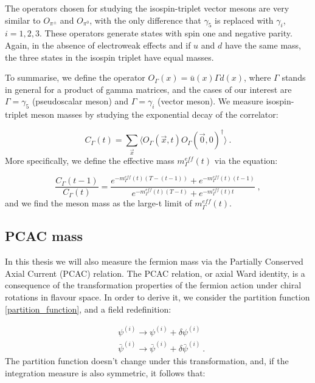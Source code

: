 The operators chosen for studying the isospin-triplet vector mesons are very similar to $O_{\pi^{\pm}}$ and $O_{\pi^0}$, with the only difference that $\gamma_5$ is replaced with $\gamma_i$, $i = 1, 2, 3$. These operators generate states with spin one and negative parity. Again, in the absence of electroweak effects and if $u$ and $d$ have the same mass, the three states in the isospin triplet have equal masses.

To summarise, we define the operator $O_{\Gamma}(x) = \bar u(x) \Gamma d(x) $, where $\Gamma$ stands in general for a product of gamma matrices, and the cases of our interest are $\Gamma =\gamma_5$ (pseudoscalar meson) and $\Gamma = \gamma_i$ (vector meson). We measure isospin-triplet meson masses by studying the exponential decay of the correlator:

\begin{equation}
C_{\Gamma}(t) = \sum_{\vec x} \langle O_{\Gamma}(\vec x,t) O_{\Gamma} (\vec 0, 0)^{\dagger} \rangle \: .
\label{meson_correlator}
\end{equation}
%
More specifically, we define the effective mass $m^{eff}_{\Gamma}(t)$ via the equation:

\begin{equation}
\frac{C_{\Gamma}(t-1)}{C_{\Gamma}(t)} = \frac{e^{-m^{eff}_{\Gamma}(t)(T-(t-1))} + e^{-m^{eff}_{\Gamma}(t)(t-1)}}{e^{-m^{eff}_{\Gamma}(t)(T-t)} + e^{-m^{eff}_{\Gamma}(t)t}} \: ,
\label{eff_mass_mesons}
\end{equation}
%
and we find the meson mass as the large-t limit of $m^{eff}_{\Gamma}(t)$. 

\subsection{PCAC mass}
\label{measure_PCAC}

In this thesis we will also measure the fermion mass via the Partially Conserved Axial Current (PCAC) relation.
The PCAC relation, or axial Ward identity, is a consequence of the transformation properties of the fermion action under chiral rotations in flavour space. In order to derive it, we consider the partition function \ref{partition_function}, and a field redefinition:

\begin{equation}
\begin{split}
& \psi^{(i)} \to \psi^{(i)} + \delta \psi^{(i)} \\
& \bar \psi^{(i)} \to \bar \psi^{(i)} +  \delta \bar\psi^{(i)} \: .
\end{split}
\end{equation}
%
The partition function doesn't change under this transformation, and, if the integration measure is also symmetric, it follows that:


